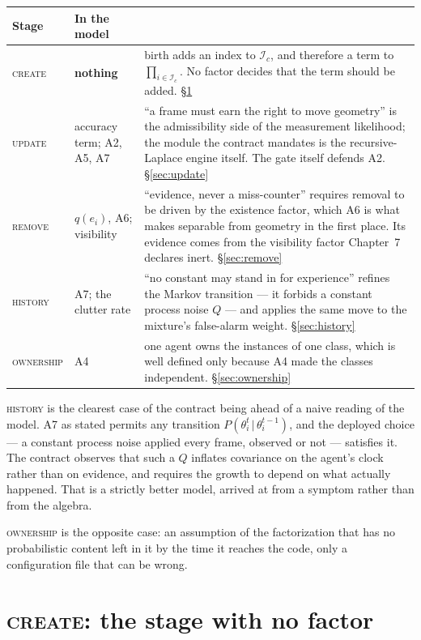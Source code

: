 \documentclass[11pt,a4paper]{report}
\newcommand{\given}{\,|\,}
\newcommand{\stage}[1]{\textsc{#1}}
\newcommand{\Create}{\stage{create}}
\newcommand{\Update}{\stage{update}}
\newcommand{\Remove}{\stage{remove}}
\newcommand{\History}{\stage{history}}
\newcommand{\Ownership}{\stage{ownership}}
\begin{document}
\begin{center}
\begin{tabular}{@{}l l p{8.0cm}@{}}
\toprule
Stage & In the model & \\
\midrule
\Create & \textbf{nothing} &
  birth adds an index to $\mathcal{I}_c$, and therefore a term to $\prod_{i\in\mathcal{I}_c}$.
  No factor decides that the term should be added. \S\ref{sec:create} \\[4pt]
\Update & accuracy term; A2, A5, A7 &
  ``a frame must earn the right to move geometry'' is the admissibility side of the measurement
  likelihood; the module the contract mandates is the recursive-Laplace engine itself. The gate
  itself defends A2. \S\ref{sec:update} \\[4pt]
\Remove & $q(e_i)$, A6; visibility &
  ``evidence, never a miss-counter'' requires removal to be driven by the existence factor, which
  A6 is what makes separable from geometry in the first place. Its evidence comes from the
  visibility factor Chapter~7 declares inert. \S\ref{sec:remove} \\[4pt]
\History & A7; the clutter rate &
  ``no constant may stand in for experience'' refines the Markov transition --- it forbids a constant
  process noise $Q$ --- and applies the same move to the mixture's false-alarm weight.
  \S\ref{sec:history} \\[4pt]
\Ownership & A4 &
  one agent owns the instances of one class, which is well defined only because A4 made the classes
  independent. \S\ref{sec:ownership} \\
\bottomrule
\end{tabular}
\end{center}

\noindent
\History{} is the clearest case of the contract being ahead of a naive reading of the model. A7 as
stated permits any transition $P(\theta_i^t\given\theta_i^{t-1})$, and the deployed choice --- a
constant process noise applied every frame, observed or not --- satisfies it. The contract observes
that such a $Q$ inflates covariance on the agent's clock rather than on evidence, and requires the
growth to depend on what actually happened. That is a strictly better model, arrived at from a
symptom rather than from the algebra.

\Ownership{} is the opposite case: an assumption of the factorization that has no probabilistic
content left in it by the time it reaches the code, only a configuration file that can be wrong.

\section{\Create: the stage with no factor}
\label{sec:create}
\end{document}

